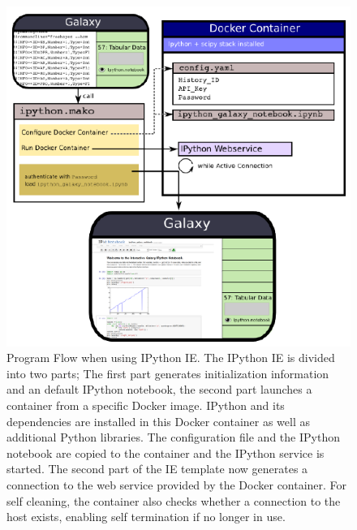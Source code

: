 \documentclass{bioinfo}
\begin{document}
\begin{methods}
\begin{figure}[!tpb]
\centerline{\includegraphics{diagram.pdf}}
\caption{Program Flow when using IPython IE. The IPython IE is divided into two parts;
The first part generates initialization information and an default IPython notebook, the second part launches a container
from a specific Docker image. IPython and its dependencies are installed in this Docker container as well as additional Python
libraries. The configuration file and the IPython notebook are copied to the container and the IPython service is started.
The second part of the IE template now generates a connection to the web service provided by the Docker container.
For self cleaning, the container also checks whether a connection to the host exists, enabling self termination 
if no longer in use.}
\label{fig:diagram}
\end{figure}


\end{methods}
\end{document}
